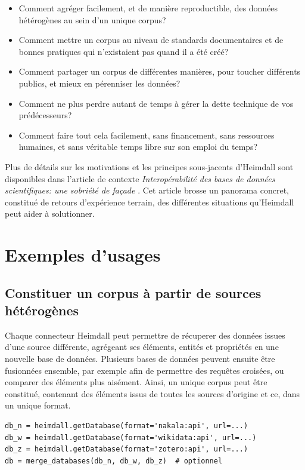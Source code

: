 \documentclass[final,fra]{anthology-ch}         %
\begin{document}
\begin{itemize}
\item
  Comment agréger facilement, et de manière reproductible, des données hétérogènes au sein d'un unique corpus?
\item
  Comment mettre un corpus au niveau de standards documentaires et de bonnes pratiques qui n'existaient pas quand il a été créé?
\item
  Comment partager un corpus de différentes manières, pour toucher différents publics, et mieux en pérenniser les données?
\item
  Comment ne plus perdre autant de temps à gérer la dette technique de vos prédécesseurs?
\item
  Comment faire tout cela facilement, sans financement, sans ressources humaines, et sans véritable temps libre sur son emploi du temps?
\end{itemize}

Plus de détails sur les motivations et les principes sous-jacents d'Heimdall sont disponibles dans l'article de contexte \emph{Interopérabilité des bases de données scientifiques: une sobriété de façade} \autocite{facade}. Cet article brosse un panorama concret, constitué de retours d'expérience terrain, des différentes situations qu'Heimdall peut aider à solutionner.

\section{Exemples d'usages}\label{exemples-dusages}

\subsection{Constituer un corpus à partir de sources
hétérogènes}\label{constituer-un-corpus-uxe0-partir-de-sources-huxe9tuxe9roguxe8nes}

Chaque connecteur Heimdall peut permettre de récuperer des données issues d'une source différente, agrégeant ses éléments, entités et propriétés en une nouvelle base de données. Plusieurs bases de données peuvent ensuite être fusionnées ensemble, par exemple afin de permettre des requêtes croisées, ou comparer des éléments plus aisément. Ainsi, un unique corpus peut être constitué, contenant des éléments issus de toutes les sources d'origine et ce, dans un unique format.

\begin{verbatim}
db_n = heimdall.getDatabase(format='nakala:api', url=...)
db_w = heimdall.getDatabase(format='wikidata:api', url=...)
db_z = heimdall.getDatabase(format='zotero:api', url=...)
db = merge_databases(db_n, db_w, db_z)  # optionnel
\end{verbatim}
\end{document}
